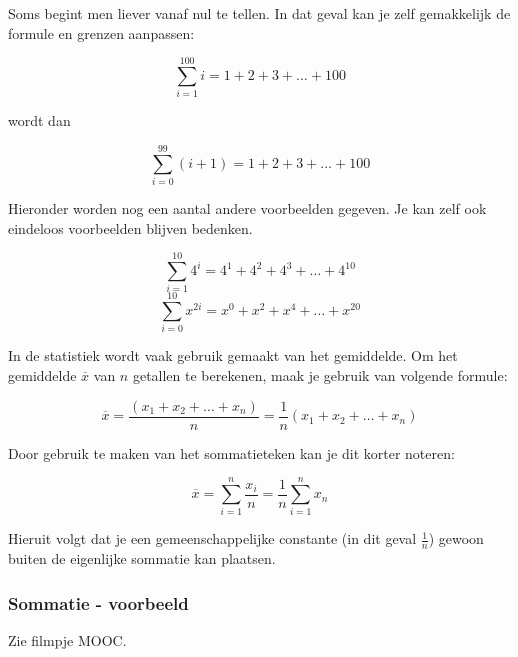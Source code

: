 \begin{voorbeeld}
	Soms begint men liever vanaf nul te tellen. In dat geval kan je zelf gemakkelijk de formule en grenzen aanpassen:
	
		\begin{equation*}
	\sum_{i=1}^{100}i = 1+2+3+\ldots+100
	\end{equation*}
	
wordt dan

	\begin{equation*}
\sum_{i=0}^{99} (i+1) = 1+2+3+\ldots+100
\end{equation*}

\end{voorbeeld}

Hieronder worden nog een aantal andere voorbeelden gegeven. Je kan zelf ook eindeloos voorbeelden blijven bedenken.

\begin{voorbeeld}
	\begin{equation*}
	\sum_{i=1}^{10} 4^i = 4^1+4^2+4^3+\ldots+4^10
	\end{equation*}
	\begin{equation*}
	\sum_{i=0}^{10} x^{2i} = x^0+x^2+x^4+\ldots+x^{20}
	\end{equation*}
\end{voorbeeld}

In de statistiek wordt vaak gebruik gemaakt van het gemiddelde. Om het gemiddelde $\overline{x}$ van $n$ getallen te berekenen, maak je gebruik van volgende formule:

\begin{equation*}
\overline{x} = \frac{(x_1+x_2+\ldots+x_n)}{n}=\frac{1}{n}(x_1+x_2+\ldots+x_n)
\end{equation*}

Door gebruik te maken van het sommatieteken kan je dit korter noteren:

\begin{equation*}
\overline{x}=\sum_{i=1}^{n}\frac{x_i}{n} = \frac{1}{n} \sum_{i=1}^{n} x_n
\end{equation*}

Hieruit volgt dat je een gemeenschappelijke constante (in dit geval $\frac{1}{n}$) gewoon buiten de eigenlijke sommatie kan plaatsen.



\subsubsection{Sommatie - voorbeeld}
Zie filmpje MOOC.

